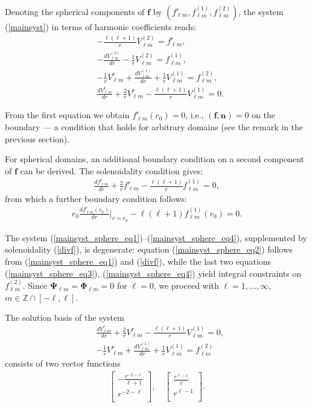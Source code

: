 \documentclass[a4paper]{article}
\newcommand{\Z}{\mathbb{Z}}
\newcommand{\bff}{\mathbf{f}}
\newcommand{\bn}{\mathbf{n}}
\begin{document}
Denoting the spherical components of $\bff$ by $(f_{\ell m}^r, f_{\ell m}^{(1)}, f_{\ell m}^{(2)})$, the system (\ref{mainsyst}) in terms of harmonic coefficients reads:
\begin{align}
&-{\frac {\ell (\ell +1)}{r}}V_{\ell m}^{(2)} = f_{\ell m}^r, \label{mainsyst_sphere_eq1}\\
&-{\frac {dV_{\ell m}^{(2)}}{dr}}-{\frac {1}{r}}V_{\ell m}^{(2)} = f_{\ell m}^{(1)}, \label{mainsyst_sphere_eq2}\\
&-{\frac {1}{r}}V_{\ell m}^{r}+ {\frac {dV_{\ell m}^{(1)}}{dr}}+{\frac {1}{r}}V_{\ell m}^{(1)} = f_{\ell m}^{(2)},\label{mainsyst_sphere_eq3}\\
&\frac {dV_{\ell m}^{r}}{dr}+{\frac {2}{r}}V_{\ell m}^{r}-{\frac {\ell (\ell +1)}{r}}V_{\ell m}^{(1)} = 0.\label{mainsyst_sphere_eq4}
\end{align}

From the first equation we obtain $f_{\ell m}^r(r_0) = 0$, i.e., $(\bff,\bn)=0$ on the boundary --- a condition that holds for arbitrary domains (see the remark in the previous section).

For spherical domains, an additional boundary condition on a second component of $\bff$ can be derived. The solenoidality condition gives:
\begin{align}\label{divf}
\frac {df_{\ell m}^{r}}{dr}+{\frac {2}{r}}f_{\ell m}^{r}-{\frac {\ell (\ell +1)}{r}}f_{\ell m}^{(1)} = 0,
\end{align}
from which a further boundary condition follows:
\begin{align*}
r_0 \frac {df_{\ell m}^r(r_0)}{dr} \Big |_{r=r_0} - \ell(\ell+1)f_{\ell m}^{(1)}(r_0) = 0.
\end{align*}

The system (\ref{mainsyst_sphere_eq1})--(\ref{mainsyst_sphere_eq4}), supplemented by solenoidality (\ref{divf}), is degenerate: equation (\ref{mainsyst_sphere_eq2}) follows from (\ref{mainsyst_sphere_eq1}) and (\ref{divf}), while the last two equations (\ref{mainsyst_sphere_eq3}), (\ref{mainsyst_sphere_eq4}) yield integral constraints on $f_{\ell m}^{(2)}$. Since $\mathbf{\Psi}_{\ell m} = \mathbf{\Phi}_{\ell m} = 0$ for $\ell=0$, we proceed with $\ell=1,\ldots,\infty$, $m\in\Z \cap [-\ell,\ell]$.

The solution basis of the system
\begin{align*}
&\frac {dV_{\ell m}^{r}}{dr}+{\frac {2}{r}}V_{\ell m}^{r}-{\frac {\ell (\ell +1)}{r}}V_{\ell m}^{(1)} = 0, \\
&-{\frac {1}{r}}V_{\ell m}^{r}+ {\frac {dV_{\ell m}^{(1)}}{dr}}+{\frac {1}{r}}V_{\ell m}^{(1)} = f_{\ell m}^{(2)}
\end{align*}
consists of two vector functions
\begin{align*}
\begin{bmatrix}-\frac{r^{-2-\ell}}{\ell+1} \\r^{-2-\ell}\\\end{bmatrix},
\quad
\begin{bmatrix}\frac{r^{\ell-1}}\ell \\r^{\ell-1}\\\end{bmatrix}.
\end{align*}
\end{document}
